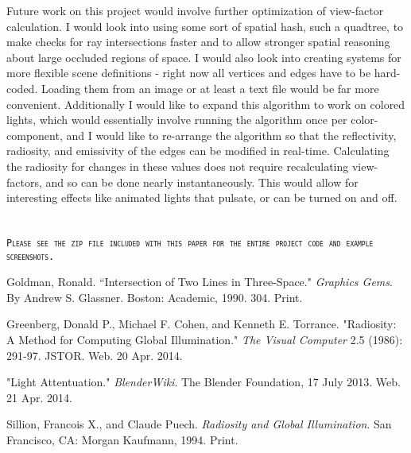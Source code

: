 \documentclass[letter]{article}
\begin{document}
Future work on this project would involve further optimization of view-factor calculation. I would look into using some sort of spatial hash, such a quadtree, to make checks for ray intersections faster and to allow stronger spatial reasoning about large occluded regions of space. I would also look into creating systems for more flexible scene definitions - right now all vertices and edges have to be hard-coded. Loading them from an image or at least a text file would be far more convenient. Additionally I would like to expand this algorithm to work on colored lights, which would essentially involve running the algorithm once per color-component, and I would like to re-arrange the algorithm so that the reflectivity, radiosity, and emissivity of the edges can be modified in real-time. Calculating the radiosity for changes in these values does not require recalculating view-factors, and so can be done nearly instantaneously. This would allow for interesting effects like animated lights that pulsate, or can be turned on and off.
\\
\\
\\
\texttt{\textsc{\large Please see the zip file included with this paper for the entire project code and example screenshots.}}

\begin{thebibliography}{9}
Goldman, Ronald. ``Intersection of Two Lines in Three-Space." \emph{Graphics Gems}. By Andrew S. Glassner. Boston: Academic, 1990. 304. Print.

Greenberg, Donald P., Michael F. Cohen, and Kenneth E. Torrance. "Radiosity: A Method for Computing Global Illumination." \emph{The Visual Computer} 2.5 (1986): 291-97. JSTOR. Web. 20 Apr. 2014. 

"Light Attentuation." \emph{BlenderWiki}. The Blender Foundation, 17 July 2013. Web. 21 Apr. 2014.

Sillion, Francois X., and Claude Puech. \emph{Radiosity and Global Illumination}. San Francisco, CA: Morgan Kaufmann, 1994. Print. 

\end{thebibliography}
\end{document}
